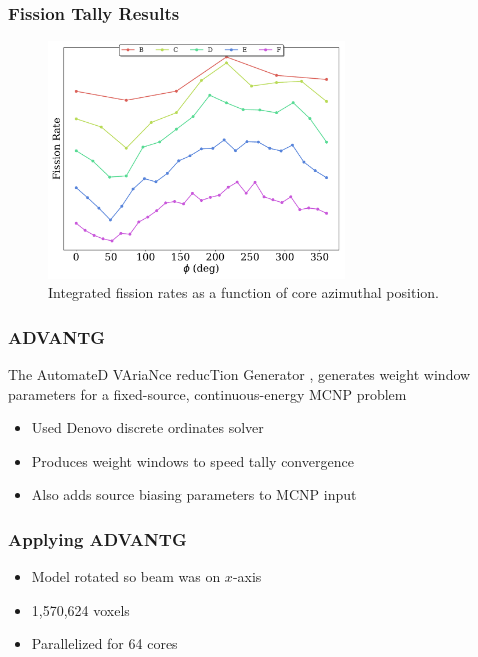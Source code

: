 \documentclass[fleqn]{beamer}
\begin{document}
\begin{frame}
\frametitle{Fission Tally Results}

\begin{figure}
\centering
\includegraphics[width = 0.7\textwidth]{totals_azi}
\caption{Integrated fission rates as a function of core azimuthal position.}
\end{figure}

\end{frame}

\begin{frame}
\frametitle{ADVANTG}

The AutomateD VAriaNce reducTion Generator \cite{mosher2013advantg}, generates weight window
parameters for a fixed-source, continuous-energy MCNP problem 

\begin{itemize}
\item Used Denovo discrete ordinates solver
\item Produces weight windows to speed tally convergence
\item Also adds source biasing parameters to MCNP input
\end{itemize}

\end{frame}

\begin{frame}
\frametitle{Applying ADVANTG}

\begin{itemize}
\item Model rotated so beam was on $x$-axis
\item 1,570,624 voxels
\item Parallelized for 64 cores
\end{itemize}

\end{frame}
\end{document}
